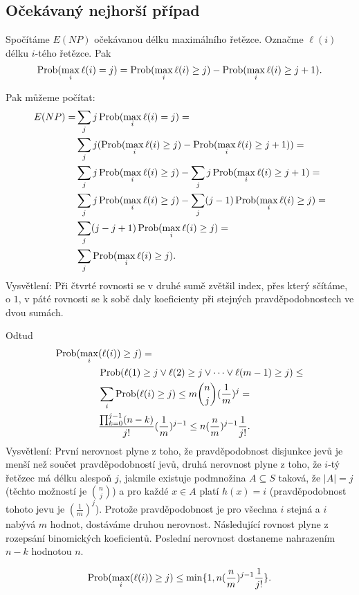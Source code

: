 \documentclass[a4paper,12pt]{article}
\begin{document}
\subsection{
Očekávaný nejhorší případ
}

Spočítáme $E(NP)$ očekávanou délku maximálního 
řetězce.\newline 
O\-znač\-me $\ell (i)$ délku $i$-tého řetězce. Pak
$$\operatorname{Prob}(\max_i\ell (i)=j)=\operatorname{Prob}(\max_i\ell (i)\ge j)-\operatorname{Prob}(\max_i
\ell (i)\ge j+1).$$

Pak můžeme počítat:
\begin{align*} E(NP)=&\sum_jj\operatorname{Prob}(\max_i\ell (i)=j)=\\
&\sum_jj(\operatorname{Prob}(\max_i\ell (i)\ge j)-\operatorname{Prob}(\max_i\ell (i)\ge j+1))
=\\
&\sum_jj\operatorname{Prob}(\max_i\ell (i)\ge j)-\sum_jj\operatorname{Prob}(\max_i\ell (i)\ge 
j+1)=\\
&\sum_jj\operatorname{Prob}(\max_i\ell (i)\ge j)-\sum_j(j-1)\operatorname{Prob}(\max_i\ell (i
)\ge j)=\\
&\sum_j(j-j+1)\operatorname{Prob}(\max_i\ell (i)\ge j)=\\
&\sum_j\operatorname{Prob}(\max_i\ell (i)\ge j).\end{align*}
Vysvětlení: Při čtvrté rovnosti se v druhé sumě zvětšil 
index, přes který sčítáme, o $1$, v páté rovnosti se k sobě 
daly koeficienty při stejných pravděpodobnostech ve dvou 
sumách. 

Odtud
\begin{align*}\operatorname{Prob}(\max_i&(\ell (i))\ge j)=\\
&\operatorname{Prob}(\ell (1)\ge j\vee\ell (2)\ge j\vee\dots\vee\ell (m-1)\ge j
)\le\\
&\sum_i\operatorname{Prob}(\ell (i)\ge j)\le m\binom nj(\frac 1m)^j=\\
&\frac {\prod_{k=0}^{j-1}(n-k)}{j!}(\frac 1m)^{j-1}\le n(\frac nm
)^{j-1}\frac 1{j!}.\end{align*}
Vysvětlení:  První nerovnost plyne z toho, že 
pravděpodobnost disjunkce jevů je menší než 
součet pravděpodobností jevů, dru\-há nerovnost 
plyne z toho, že $i$-tý řetězec má délku alespoň $
j$, jakmile existuje 
podmnožina $A\subseteq S$ taková, že $|A|=j$ (těchto možností je $\binom 
nj$) a pro každé $x\in A$ platí $h(x)=i$ (pravděpo\-dob\-nost 
tohoto jevu je $(\frac 1m)^j$). Protože pravděpodobnost je pro všechna $i$ stejná a $i$ nabývá $m$ hodnot, dostáváme druhou nerovnost. Následující rovnost plyne z rozepsání binomických koeficientů. Poslední nerovnost dostane\-me nahrazením $n-k$ hodnotou $n$.

\begin{dusledek}
$$\operatorname{Prob}(\max_i(\ell (i))\ge j)\le\min\{1,n(\frac nm)^{j-1}\frac 1{
j!}\}.$$
\end{dusledek}
\end{document}
